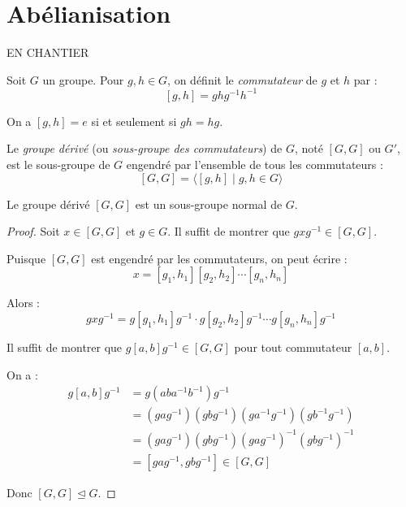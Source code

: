 \section{Abélianisation}
\begin{tcolorbox}
    EN CHANTIER
\end{tcolorbox}
\begin{definition}[Commutateur]
Soit $G$ un groupe. Pour $g, h \in G$, on définit le \emph{commutateur} de $g$ et $h$ par :
$$[g, h] = ghg^{-1}h^{-1}$$
\end{definition}

\begin{remarque}
On a $[g, h] = e$ si et seulement si $gh = hg$.
\end{remarque}

\begin{definition}
Le \emph{groupe dérivé} (ou \emph{sous-groupe des commutateurs}) de $G$, noté $[G, G]$ ou $G'$, est le sous-groupe de $G$ engendré par l'ensemble de tous les commutateurs :
$$[G, G] = \langle [g, h] \mid g, h \in G \rangle$$
\end{definition}

\begin{proposition}
Le groupe dérivé $[G, G]$ est un sous-groupe normal de $G$.
\end{proposition}

\begin{proof}
Soit $x \in [G, G]$ et $g \in G$. Il suffit de montrer que $gxg^{-1} \in [G, G]$.

Puisque $[G, G]$ est engendré par les commutateurs, on peut écrire :
$$x = [g_1, h_1][g_2, h_2] \cdots [g_n, h_n]$$

Alors :
$$gxg^{-1} = g[g_1, h_1]g^{-1} \cdot g[g_2, h_2]g^{-1} \cdots g[g_n, h_n]g^{-1}$$

Il suffit de montrer que $g[a, b]g^{-1} \in [G, G]$ pour tout commutateur $[a, b]$.

On a :
\begin{align*}
g[a, b]g^{-1} &= g(aba^{-1}b^{-1})g^{-1}\\
&= (gag^{-1})(gbg^{-1})(ga^{-1}g^{-1})(gb^{-1}g^{-1})\\
&= (gag^{-1})(gbg^{-1})(gag^{-1})^{-1}(gbg^{-1})^{-1}\\
&= [gag^{-1}, gbg^{-1}] \in [G, G]
\end{align*}

Donc $[G, G] \trianglelefteq G$.
\end{proof}

